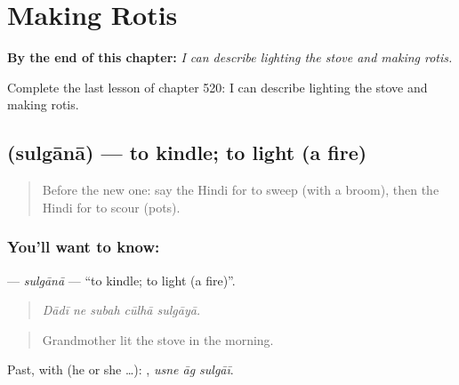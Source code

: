 
\chapter{Making Rotis}
\label{ch:hi-making-rotis}

\begin{chapteropening}
\textbf{By the end of this chapter:} \emph{I can describe lighting the stove and making rotis.}

Complete the last lesson of chapter 520: I can describe lighting the stove and making rotis.
\end{chapteropening}

\section[\texorpdfstring{\hi{सुलगाना} (sulgānā)}{सुलगाना (sulgānā)}]{ (sulgānā) — to kindle; to light (a fire)}

\label{lesson:HI-C520-sulgana}



\begin{quote}
Before the new one: say the Hindi for to sweep (with a broom), then the Hindi for to scour (pots).
\end{quote}

\subsection*{You'll want to know: }
\textbf{} — \emph{sulgānā} — \textquotedblleft{}to kindle; to light (a fire)\textquotedblright{}.

\begin{quote}
    
\end{quote}

\begin{quote}
\emph{Dādī ne subah cūlhā sulgāyā.}
\end{quote}

\begin{quote}
Grandmother lit the stove in the morning.
\end{quote}

Past, with  (he or she …):   , \emph{usne āg sulgāī}.

